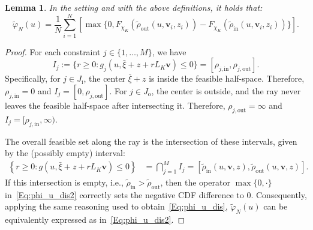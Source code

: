 \documentclass[10pt,a4paper]{amsart}
\newtheorem{lemma}{Lemma}
\begin{document}
\begin{lemma}
    In the setting and with the above definitions, it holds that:
    \begin{equation}\label{Eq:phi_u_dis2}
        \tilde{\varphi}_N(u)=\frac{1}{N}\sum_{i=1}^N \left[ \max{\{0, F_{\chi_K}(\tilde{\rho}_{\mathrm{out}}(u,\boldsymbol{v}_i,z_i))-F_{\chi_K}(\tilde{\rho}_{\mathrm{in}}(u,\boldsymbol{v}_i,z_i))\}} \right].
    \end{equation}
\end{lemma}

\begin{proof}
    For each constraint $j \in \{1, \dots, M\}$, we have
    \begin{equation*}
        I_j := \{r \ge 0 : g_j(u,\bar{\xi}+z+r L_K\boldsymbol{v}) \le 0\} = [\rho_{j,\mathrm{in}}, \rho_{j,\mathrm{out}}].
    \end{equation*}
    Specifically, for $j \in J_{\mathrm{i}}$, the center $\bar{\xi}+z$ is inside the feasible half-space. Therefore, $\rho_{j,\mathrm{in}} = 0$ and $I_j = [0, \rho_{j,\mathrm{out}}]$. For $j \in J_{\mathrm{o}}$, the center is outside, and the ray never leaves the feasible half-space after intersecting it. Therefore, $\rho_{j,\mathrm{out}} = \infty$ and $I_j = [\rho_{j,\mathrm{in}}, \infty)$.
    
    The overall feasible set along the ray is the intersection of these intervals, given by the (possibly empty) interval:
    \begin{equation*}
        \begin{aligned}
            \left\{r\geq 0: g(u,\bar{\xi}+z+r L_K\boldsymbol{v})\leq 0\right\} &= \bigcap_{j=1}^M I_j = %
            [\tilde{\rho}_{\mathrm{in}}(u,\boldsymbol{v},z), \tilde{\rho}_{\mathrm{out}}(u,\boldsymbol{v},z)].
        \end{aligned}
    \end{equation*}
  If this intersection is empty, i.e., $\tilde{\rho}_{\mathrm{in}} > \tilde{\rho}_{\mathrm{out}}$, then the operator $\max\{0,\cdot\}$ in~\eqref{Eq:phi_u_dis2} correctly sets the negative CDF difference to $0$. Consequently, applying the same reasoning used to obtain~\eqref{Eq:phi_u_dis}, $\tilde{\varphi}_N(u)$ can be equivalently expressed as in~\eqref{Eq:phi_u_dis2}.
\end{proof}
\end{document}
